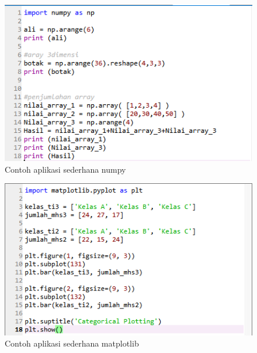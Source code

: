 \begin{figure}
      \centerline{\includegraphics[width=1\textwidth]
      {figures/cokro/c41}}
      \caption{Contoh aplikasi sederhana numpy}
      \label{c41}
      \end{figure}

\begin{figure}
      \centerline{\includegraphics[width=1\textwidth]
      {figures/cokro/c42}}
      \caption{Contoh aplikasi sederhana matplotlib}
      \label{c42}
      \end{figure}

